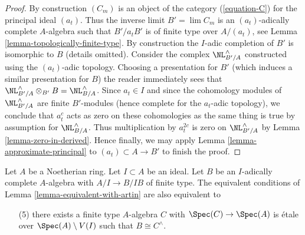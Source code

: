 \begin{proof}
\medskip\noindent
By construction $(C_m)$ is an object of the category
(\ref{equation-C}) for the principal ideal $(a_t)$.
Thus the inverse limit $B' = \lim C_m$ is an $(a_t)$-adically
complete $A$-algebra such that $B'/a_t B'$ is of finite type
over $A/(a_t)$, see Lemma \ref{lemma-topologically-finite-type}.
By construction the $I$-adic completion of $B'$ is isomorphic to $B$
(details omitted). Consider the complex $\NL^\wedge_{B'/A}$ constructed
using the $(a_t)$-adic topology. Choosing a presentation for $B'$
(which induces a similar presentation for $B$) the reader immediately
sees that $\NL^\wedge_{B'/A} \otimes_{B'} B = \NL^\wedge_{B/A}$.
Since $a_t \in I$ and since the cohomology modules of
$\NL^\wedge_{B'/A}$ are finite $B'$-modules (hence complete for the
$a_t$-adic topology), we conclude that $a_t^c$ acts as zero on
these cohomologies as the same thing is true by assumption for
$\NL^\wedge_{B/A}$. Thus multiplication by $a_t^{2c}$ is zero
on $\NL^\wedge_{B'/A}$ by Lemma \ref{lemma-zero-in-derived}.
Hence finally, we may apply Lemma \ref{lemma-approximate-principal}
to $(a_t) \subset A \to B'$ to finish the proof.
\end{proof}

\begin{lemma}
\label{lemma-approximate-by-etale-over-complement}
Let $A$ be a Noetherian ring. Let $I \subset A$ be an ideal.
Let $B$ be an $I$-adically complete $A$-algebra with $A/I \to B/IB$
of finite type. The equivalent conditions of
Lemma \ref{lemma-equivalent-with-artin} are also equivalent to
\begin{enumerate}
\item[(5)]
\label{item-algebraize}
there exists a finite type $A$-algebra $C$ with
$\Spec(C) \to \Spec(A)$ is \'etale over $\Spec(A) \setminus V(I)$
such that $B \cong C^\wedge$.
\end{enumerate}
\end{lemma}

